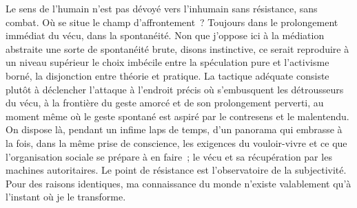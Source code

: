 \documentclass[french,twoside]{book} %
\begin{document}
Le sens de l’humain n’est pas dévoyé vers l’inhumain sans résistance, sans combat. Où se situe le champ d’affrontement ? Toujours dans le prolongement immédiat du vécu, dans la spontanéité. Non que j’oppose ici à la médiation abstraite une sorte de spontanéité brute, disons instinctive, ce serait reproduire à un niveau supérieur le choix imbécile entre la spéculation pure et l’activisme borné, la disjonction entre théorie et pratique. La tactique adéquate consiste plutôt à déclencher l’attaque à l’endroit précis où s’embusquent les détrousseurs du vécu, à la frontière du geste amorcé et de son prolongement perverti, au moment même où le geste spontané est aspiré par le contresens et le malentendu. On dispose là, pendant un infime laps de temps, d’un panorama qui embrasse à la fois, dans la même prise de conscience, les exigences du vouloir-vivre et ce que l’organisation sociale se prépare à en faire ; le vécu et sa récupération par les machines autoritaires. Le point de résistance est l’observatoire de la subjectivité. Pour des raisons identiques, ma connaissance du monde n’existe valablement qu’à l’instant où je le transforme.
\end{document}
